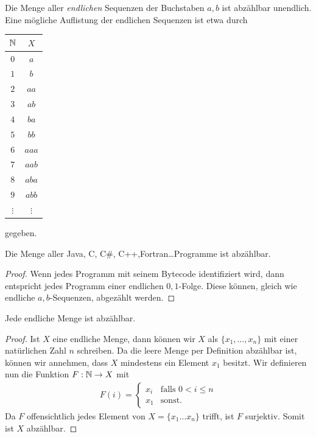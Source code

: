 \begin{bsp}
Die Menge aller \textit{endlichen} Sequenzen der Buchstaben $a,b$ ist abzählbar unendlich. Eine mögliche Auflistung der endlichen Sequenzen ist etwa durch
\begin{center}
\begin{tabular}{c|c}
$\mathbb{N}$ & $X$\\
\hline
$0$ & $a$\\
$1$ & $b$\\
$2$ & $aa$\\
$3$&$ab$\\
$4$&$ba$\\
$5$&$bb$\\
$6$&$aaa$\\
$7$ & $aab$\\
$8$ & $aba$\\
$9$ & $abb$\\
$\vdots$ & $\vdots$
\end{tabular}
\end{center}
gegeben.
\end{bsp}
\begin{bsp}
Die Menge aller Java, C, C\#, C++,Fortran\dots Programme ist abzählbar.
\end{bsp}
\begin{proof}
Wenn jedes Programm mit seinem Bytecode identifiziert wird, dann entspricht jedes Programm einer endlichen $0,1$-Folge. Diese können, gleich wie endliche $a,b$-Sequenzen, abgezählt werden.
\end{proof}
\begin{satz}
Jede endliche Menge ist abzählbar.
\end{satz}
\begin{proof}
Ist $X$ eine endliche Menge, dann können wir $X$ als $\{x_1,\dots,x_n\}$ mit einer natürlichen Zahl $n$ schreiben. Da die leere Menge per Definition abzählbar ist, können wir annehmen, dass $X$ mindestens ein Element $x_1$ besitzt. Wir definieren nun die Funktion $F:\mathbb{N}\to X$ mit
\begin{align*}
F(i)=\begin{cases}
x_i&\text{falls }0<i\leq n\\
x_1&\text{sonst.}
\end{cases}
\end{align*}
Da $F$ offensichtlich jedes Element von $X=\{x_1\dots x_n\}$ trifft, ist $F$ surjektiv. Somit ist $X$ abzählbar.
\end{proof}

